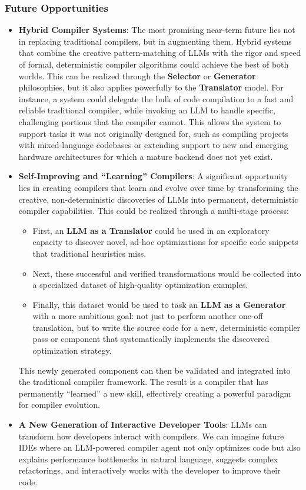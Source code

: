 \documentclass[pdflatex,sn-mathphys-ay,twocolumn, a4paper]{sn-jnl}%
\theoremstyle{thmstyleone}%
\theoremstyle{thmstyletwo}%
\theoremstyle{thmstylethree}%
\begin{document}
\subsubsection{Future Opportunities}

\begin{itemize}
    \item \textbf{Hybrid Compiler Systems}: The most promising near-term future lies not in replacing traditional compilers, but in augmenting them. Hybrid systems that combine the creative pattern-matching of LLMs with the rigor and speed of formal, deterministic compiler algorithms could achieve the best of both worlds. This can be realized through the \textbf{Selector} or \textbf{Generator} philosophies, but it also applies powerfully to the \textbf{Translator} model. For instance, a system could delegate the bulk of code compilation to a fast and reliable traditional compiler, while invoking an LLM to handle specific, challenging portions that the compiler cannot. This allows the system to support tasks it was not originally designed for, such as compiling projects with mixed-language codebases or extending support to new and emerging hardware architectures for which a mature backend does not yet exist.
    \item \textbf{Self-Improving and ``Learning'' Compilers}: A significant opportunity lies in creating compilers that learn and evolve over time by transforming the creative, non-deterministic discoveries of LLMs into permanent, deterministic compiler capabilities. This could be realized through a multi-stage process: 
    \begin{itemize}
        \item First, an \textbf{LLM as a Translator} could be used in an exploratory capacity to discover novel, ad-hoc optimizations for specific code snippets that traditional heuristics miss.
        \item Next, these successful and verified transformations would be collected into a specialized dataset of high-quality optimization examples.
        \item Finally, this dataset would be used to task an \textbf{LLM as a Generator} with a more ambitious goal: not just to perform another one-off translation, but to write the source code for a new, deterministic compiler pass or component that systematically implements the discovered optimization strategy.
    \end{itemize}
    This newly generated component can then be validated and integrated into the traditional compiler framework. The result is a compiler that has permanently ``learned'' a new skill, effectively creating a powerful paradigm for compiler evolution.
    \item \textbf{A New Generation of Interactive Developer Tools}: LLMs can transform how developers interact with compilers. We can imagine future IDEs where an LLM-powered compiler agent not only optimizes code but also explains performance bottlenecks in natural language, suggests complex refactorings, and interactively works with the developer to improve their code.
\end{itemize}
\end{document}

